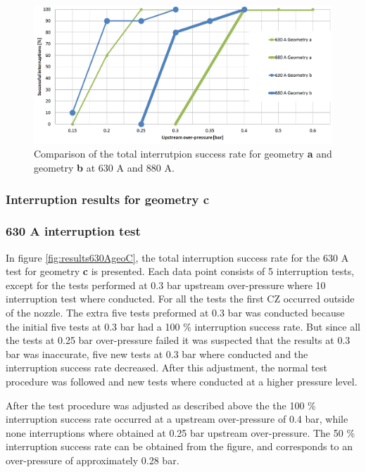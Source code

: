 \documentclass[10pt,b5paper,twoside]{article}
\begin{document}
\begin{figure}[H]
\centering
\includegraphics[scale=0.5, angle =90 ]{Bilder/Results/compAllFunnel.png}
\caption{Comparison of the total interrutpion success rate for geometry \textbf{a} and geometry \textbf{b} at 630 A and 880 A.} \label{fig:compgeoAandBAllcurrents}
\end{figure}


\subsubsection{Interruption results for geometry \textbf{c}} \label{sec:intTestGeoC}

\subsubsection*{630 A interruption test}
In figure \ref{fig:results630AgeoC}, the total interruption success rate for the 630 A test for geometry \textbf{c} is presented. Each data point consists of 5 interruption tests, except for the tests performed at 0.3 bar upstream over-pressure where 10 interruption test where conducted. For all the tests the first CZ occurred outside of the nozzle. The extra five tests preformed at 0.3 bar was conducted because the initial five tests at 0.3 bar had a 100 \% interruption success rate. But since all the tests at 0.25 bar over-pressure failed it was suspected that the results at 0.3 bar was inaccurate, five new tests at 0.3 bar where conducted and the interruption success rate decreased. After this adjustment, the normal test procedure was followed and new tests where conducted at a higher pressure level.

After the test procedure was adjusted as described above the the 100 \% interruption success rate occurred at a upstream over-pressure of 0.4 bar, while none interruptions where obtained at 0.25 bar upstream over-pressure. The 50 \% interruption success rate can be obtained from the figure, and corresponds to an over-pressure of approximately 0.28 bar.
\end{document}
